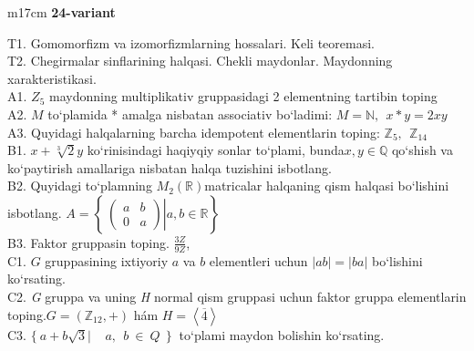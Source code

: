 \documentclass{article}
\begin{document}
\begin{tabular}{m{17cm}}
\textbf{24-variant}
\newline

T1. Gomomorfizm va izomorfizmlarning hossalari. Keli teoremasi. \\
T2. Chegirmalar sinflarining halqasi. Chekli maydonlar. Maydonning xarakteristikasi. \\
A1. \(Z_{5}\) maydonning multiplikativ gruppasidagi 2 elementning tartibin toping \\
A2. \(M\) to`plamida * amalga nisbatan associativ bo`ladimi: \(M\mathbb{= N},\ \ x*y = 2xy\) \\
A3. Quyidagi halqalarning barcha idempotent elementlarin toping: \(\mathbb{Z}_{5},\ \ \mathbb{Z}_{14}\) \\
B1. \(x + \sqrt[3]{2}y\) ko`rinisindagi haqiyqiy sonlar to`plami, bunda\(x,y\mathbb{\in Q}\) qo`shish va ko`paytirish amallariga nisbatan halqa tuzishini isbotlang. \\
B2. Quyidagi to`plamning \(M_{2}(\mathbb{R})\)matricalar halqaning qism halqasi bo`lishini isbotlang. \(A = \left\{ \left. \ \begin{pmatrix}
a & b \\
0 & a
\end{pmatrix} \right|a,b\mathbb{\in R} \right\}\) \\
B3. Faktor gruppasin toping. \(\frac{3Z}{9Z}\), \\
C1. \(G\) gruppasining ixtiyoriy \(a\) va \(b\) elementleri uchun \(|ab| = |ba|\) bo`lishini ko`rsating. \\
C2. \emph{G} gruppa va uning \emph{H} normal qism gruppasi uchun faktor gruppa elementlarin toping.\(G = (\mathbb{Z}_{12}, + )\) hám \(H = \left\langle \overline{4} \right\rangle\) \\
C3. \(\{\ a + b\sqrt{3}\left| \ \ \ \ \ a,\ \ b\  \in \ Q\ \ \} \right.\ \) to`plami maydon bo\textquotesingle lishin ko`rsating. \\

\end{tabular}
\vspace{1cm}
\end{document}
